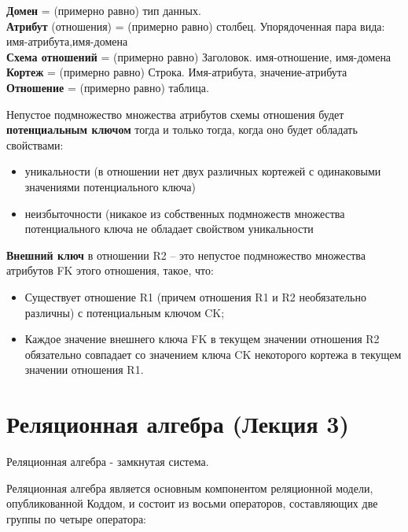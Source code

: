 \textbf{Домен} = (примерно равно) тип данных.\\
\textbf{Атрибут} (отношения) = (примерно равно) столбец. Упорядоченная пара вида:\\
имя-атрибута,имя-домена\\
\textbf{Схема отношений} = (примерно равно) Заголовок. имя-отношение, имя-домена\\
\textbf{Кортеж} = (примерно равно) Строка. Имя-атрибута, значение-атрибута
\textbf{Отношение} = (примерно равно) таблица.

Непустое подмножество множества атрибутов схемы отношения будет \textbf{потенциальным ключом} тогда и только тогда,
когда оно будет обладать свойствами:
\begin{itemize}
	\item уникальности (в отношении нет двух различных кортежей с одинаковыми
	      значениями потенциального ключа)
	\item неизбыточности (никакое из собственных подмножеств множества
	      потенциального ключа не обладает свойством уникальности
\end{itemize}

\textbf{Внешний ключ} в отношении R2 – это непустое подмножество множества атрибутов FK этого отношения, такое, что:
\begin{itemize}
	\item Существует отношение R1 (причем отношения R1 и R2 необязательно различны) с потенциальным ключом CK;
	\item Каждое значение внешнего ключа FK в текущем значении отношения R2 обязательно совпадает со значением ключа CK
	      некоторого кортежа в текущем значении отношения R1.
\end{itemize}


\chapter{Реляционная алгебра (Лекция 3)}

Реляционная алгебра - замкнутая система.

Реляционная алгебра является основным компонентом реляционной модели, опубликованной Коддом, и состоит из
восьми операторов, составляющих две группы по четыре оператора:


